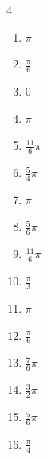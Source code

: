 \begin{multicols}{4}
\begin{enumerate}
  \item $\displaystyle \pi$

  \item $\displaystyle \frac{\pi}{6}$

  \item $\displaystyle 0$

  \item $\displaystyle \pi$

  \item $\displaystyle \frac{11}{6}\pi$

  \item $\displaystyle \frac{5}{4}\pi$

  \item $\displaystyle \pi$

\columnbreak %

  \item $\displaystyle \frac{5}{6}\pi$

  \item $\displaystyle \frac{11}{6}\pi$

  \item $\displaystyle \frac{\pi}{3}$

  \item $\displaystyle \pi$

  \item $\displaystyle \frac{\pi}{6}$

  \item $\displaystyle \frac{7}{6}\pi$

  \item $\displaystyle \frac{3}{2}\pi$

  \item $\displaystyle \frac{5}{6}\pi$

  \item $\displaystyle \frac{\pi}{4}$


\end{enumerate}
\end{multicols}
